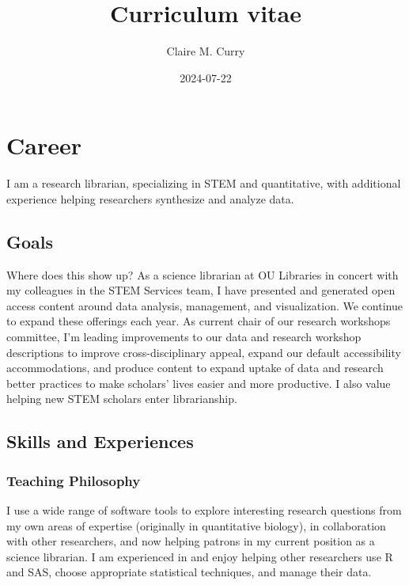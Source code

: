 \documentclass[
  letterpaper,
  DIV=11,
  numbers=noendperiod,
  oneside]{scrreprt}
\title{Curriculum vitae}
\author{Claire M. Curry}
\date{2024-07-22}
\begin{document}
\maketitle


\chapter{Career}\label{career}

I am a research librarian, specializing in STEM and quantitative, with
additional experience helping researchers synthesize and analyze data.

\section{Goals}\label{goals}

Where does this show up? As a science librarian at OU Libraries in
concert with my colleagues in the STEM Services team, I have presented
and generated open access content around data analysis, management, and
visualization. We continue to expand these offerings each year. As
current chair of our research workshops committee, I'm leading
improvements to our data and research workshop descriptions to improve
cross-disciplinary appeal, expand our default accessibility
accommodations, and produce content to expand uptake of data and
research better practices to make scholars' lives easier and more
productive. I also value helping new STEM scholars enter librarianship.

\section{Skills and Experiences}\label{skills-and-experiences}

\subsection{Teaching Philosophy}\label{teaching-philosophy}

I use a wide range of software tools to explore interesting research
questions from my own areas of expertise (originally in quantitative
biology), in collaboration with other researchers, and now helping
patrons in my current position as a science librarian. I am experienced
in and enjoy helping other researchers use R and SAS, choose appropriate
statistical techniques, and manage their data.
\end{document}
